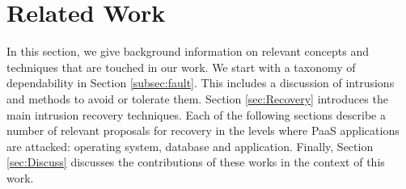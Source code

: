 
\section{Related Work}
\label{sec:RelatedWork}
In this section, we give background information on relevant concepts and techniques that are touched in our work. We start with a taxonomy of dependability in Section \ref{subsec:fault}. This includes a discussion of intrusions and methods to avoid or tolerate them. Section \ref{sec:Recovery} introduces the main intrusion recovery techniques. Each of the following sections describe a number of relevant proposals for recovery in the levels where PaaS applications are attacked: operating system, database and application. Finally, Section \ref{sec:Discuss} discusses the contributions of these works in the context of this work.